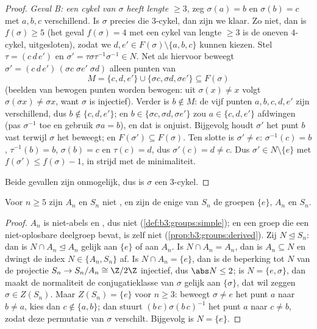 \begin{proof}
\emph{Geval B: een cykel van $\sigma$ heeft lengte $\geq 3$}, zeg
$\sigma(a) = b$ en $\sigma(b) = c$ met $a, b, c$ verschillend. Is
$\sigma$ precies die $3$-cykel, dan zijn we klaar. Zo niet, dan is
$f(\sigma) \geq 5$ (het geval $f(\sigma) = 4$ met een cykel van
lengte $\geq 3$ is de oneven $4$-cykel, uitgesloten), zodat we $d,
e' \in F(\sigma) \setminus \{a, b, c\}$ kunnen kiezen. Stel $\tau =
(c\,d\,e')$ en $\sigma' = \tau\sigma\tau^{-1}\sigma^{-1} \in N$.
Net als hiervoor beweegt $\sigma' = (c\,d\,e')\,(\sigma c\;\sigma
e'\;\sigma d)$ alleen punten van
\[
M = \{c, d, e'\} \cup \{\sigma c, \sigma d, \sigma e'\}
\subseteq F(\sigma)
\]
(beelden van bewogen punten worden bewogen: uit $\sigma(x) \ne x$
volgt $\sigma(\sigma x) \neq \sigma x$, want $\sigma$ is
injectief). Verder is $b \notin M$: de vijf punten $a, b, c, d, e'$
zijn verschillend, dus $b \notin \{c, d, e'\}$; en $b \in \{\sigma
c, \sigma d, \sigma e'\}$ zou $a \in \{c, d, e'\}$ afdwingen (pas
$\sigma^{-1}$ toe en gebruik $\sigma a = b$), en dat is onjuist.
Bijgevolg houdt $\sigma'$ het punt $b$ vast terwijl $\sigma$ het
beweegt; en $F(\sigma') \subseteq F(\sigma)$. Ten slotte is
$\sigma' \neq e$: $\sigma^{-1}(c) = b$, $\tau^{-1}(b) = b$,
$\sigma(b) = c$ en $\tau(c) = d$, dus $\sigma'(c) = d \neq c$. Dus
$\sigma' \in N \setminus \{e\}$ met $f(\sigma') \leq f(\sigma) -
1$, in strijd met de minimaliteit.

Beide gevallen zijn onmogelijk, dus is $\sigma$ een $3$-cykel.
\end{proof}

\begin{corollary}\label{cor:b3:groups:snnotsolvable}
Voor $n \geq 5$ zijn $A_n$ en $S_n$ niet , en zijn de
enige  van $S_n$ de groepen $\{e\}$, $A_n$ en $S_n$.
\end{corollary}

\begin{proof}
$A_n$ is niet-abels en , dus niet 
(\cref{def:b3:groups:simple}); en een groep die een niet-oplosbare
deelgroep bevat, is zelf niet 
(\cref{prop:b3:groups:derived}). Zij $N \trianglelefteq S_n$: dan
is $N \cap A_n \trianglelefteq A_n$ gelijk aan $\{e\}$ of aan
$A_n$. Is $N \cap A_n = A_n$, dan is $A_n \subseteq N$ en dwingt de
index $N \in \{A_n, S_n\}$ af. Is $N \cap A_n = \{e\}$, dan is de
beperking tot $N$ van de projectie $S_n \to S_n/A_n \cong \Z/2\Z$
injectief, dus $\abs N \leq 2$; is $N = \{e, \sigma\}$, dan maakt
de normaliteit de conjugatieklasse van $\sigma$ gelijk aan
$\{\sigma\}$, dat wil zeggen $\sigma \in Z(S_n)$. Maar $Z(S_n) =
\{e\}$ voor $n \geq 3$: beweegt $\sigma \ne e$ het punt $a$ naar $b
\neq a$, kies dan $c \notin \{a, b\}$; dan stuurt
$(b\,c)\sigma(b\,c)^{-1}$ het punt $a$ naar $c \ne b$, zodat deze
permutatie van $\sigma$ verschilt. Bijgevolg is $N = \{e\}$.
\end{proof}

